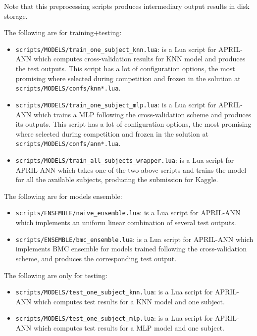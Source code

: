 \documentclass[a4paper,english,twoside]{article}
\begin{document}
\noindent Note that this preprocessing scripts produces intermediary output
results in disk storage.

The following are for training+testing:

\begin{itemize}
\item \verb+scripts/MODELS/train_one_subject_knn.lua+: is a Lua script for
  APRIL-ANN which computes cross-validation results for KNN model and produces
  the test outputs. This script has a lot of configuration options, the most
  promising where selected during competition and frozen in the solution at
  \verb+scripts/MODELS/confs/knn*.lua+.
\item \verb+scripts/MODELS/train_one_subject_mlp.lua+: is a Lua script for
  APRIL-ANN which trains a MLP following the cross-validation scheme and
  produces its outputs. This script has a lot of configuration options, the most
  promising where selected during competition and frozen in the solution at
  \verb+scripts/MODELS/confs/ann*.lua+.
\item \verb+scripts/MODELS/train_all_subjects_wrapper.lua+: is a Lua script for
  APRIL-ANN which takes one of the two above scripts and trains the model for
  all the available subjects, producing the submission for Kaggle.
\end{itemize}

The following are for models ensemble:

\begin{itemize}
\item \verb+scripts/ENSEMBLE/naive_ensemble.lua+: is a Lua script for
  APRIL-ANN which implements an uniform linear combination of several test
  outputs.
\item \verb+scripts/ENSEMBLE/bmc_ensemble.lua+: is a Lua script for APRIL-ANN
  which implements BMC ensemble for models trained following the
  cross-validation scheme, and produces the corresponding test output.
\end{itemize}

The following are only for testing:

\begin{itemize}
\item \verb+scripts/MODELS/test_one_subject_knn.lua+: is a Lua script for
  APRIL-ANN which computes test results for a KNN model and one subject.
\item \verb+scripts/MODELS/test_one_subject_mlp.lua+: is a Lua script for
  APRIL-ANN which computes test results for a MLP model and one subject.
\end{itemize}
\end{document}
